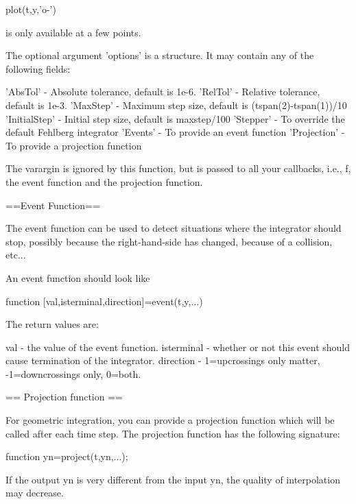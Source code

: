       plot(t,y,'o-')

 is only available at a few points.

 The optional argument 'options' is a structure. It may contain any of the
 following fields:

 'AbsTol'      - Absolute tolerance, default is 1e-6.
 'RelTol'      - Relative tolerance, default is 1e-3.
 'MaxStep'     - Maximum step size, default is (tspan(2)-tspan(1))/10
 'InitialStep' - Initial step size, default is maxstep/100
 'Stepper'     - To override the default Fehlberg integrator
 'Events'      - To provide an event function
 'Projection'  - To provide a projection function

 The varargin is ignored by this function, but is passed to all your callbacks, i.e.,
 f, the event function and the projection function.

 ==Event Function==

 The event function can be used to detect situations where the integrator should stop,
 possibly because the right-hand-side has changed, because of a collision, etc...

 An event function should look like

    function [val,isterminal,direction]=event(t,y,...)

 The return values are:

 val        - the value of the event function.
 isterminal - whether or not this event should cause termination of the integrator.
 direction  - 1=upcrossings only matter, -1=downcrossings only, 0=both.

 == Projection function ==

 For geometric integration, you can provide a projection function which will be
 called after each time step. The projection function has the following signature:

     function yn=project(t,yn,...);

 If the output yn is very different from the input yn, the quality of interpolation
 may decrease.
